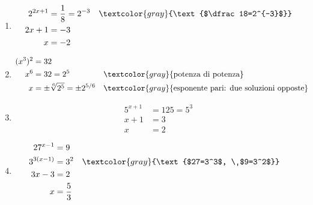 \begin{question}[ID=1.3, subtitle={Equazioni risolte con le proprietà delle potenze}, tags={potenze, equazioni}, difficulty=media]
\begin{explanation}
\begin{enumerate}
\[\begin{aligned}
    x &= \dfrac32
    \end{aligned}\]
    \item \[\begin{aligned}
    2^{2x+1} &= \dfrac18=2^{-3} && \textcolor{gray}{\text{$\dfrac18=2^{-3}$}}\\
    2x+1 &= -3\\
    x &= -2
    \end{aligned}\]
    \item \[\begin{aligned}
    (x^3)^2 &= 32\\
    x^6 &= 32=2^5 && \textcolor{gray}{\text{potenza di potenza}}\\
    x &= \pm\sqrt[6]{2^5}=\pm2^{5/6} && \textcolor{gray}{\text{esponente pari: due soluzioni opposte}}
    \end{aligned}\]
    \item \[\begin{aligned}
    5^{x+1} &= 125=5^3\\
    x+1 &= 3\\
    x &= 2
    \end{aligned}\]
    \item \[\begin{aligned}
    27^{x-1} &= 9\\
    3^{3(x-1)} &= 3^2 && \textcolor{gray}{\text{$27=3^3$, \ $9=3^2$}}\\
    3x-3 &= 2\\
    x &= \dfrac53
    \end{aligned}\]
\end{enumerate}
\end{explanation}
\end{question}


